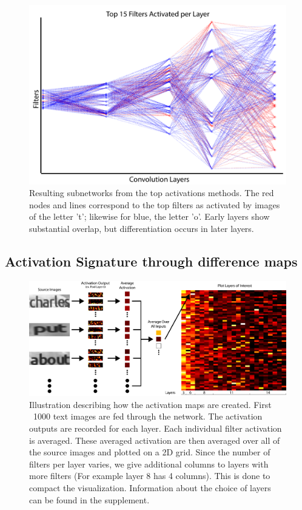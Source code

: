 \documentclass[10pt,twocolumn,letterpaper]{article}
\begin{document}
\begin{figure}
\includegraphics[width=\columnwidth]{Figures/max_activations/max_activations-01.png}
\caption{Resulting subnetworks from the top activations methods. The red nodes and lines correspond to the top filters as activated by images of the letter 't'; likewise for blue, the letter 'o'. Early layers show substantial overlap, but differentiation occurs in later layers.}
\label{fig:activationgraph}
\end{figure}

\subsection{Activation Signature through difference maps} \label{sec:subnetwork}
\begin{figure}
\centering
\includegraphics[width=1\textwidth]{Figures/activations_map_overview/act_map_overview-01.png}
\caption{Illustration describing how the activation maps are created. First ~1000 text images are fed through the network. The activation outputs are recorded for each layer. Each individual filter activation is averaged. These averaged activation are then averaged over all of the source images and plotted on a 2D grid. Since the number of filters per layer varies, we give additional columns to layers with more filters (For example layer 8 has 4 columns). This is done to compact the visualization. Information about the choice of layers can be found in the supplement.}
\label{fig:subvis}
\end{figure}
\end{document}
